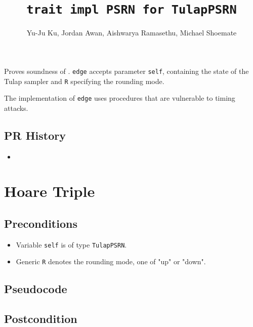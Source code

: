 \documentclass{article}
\title{\texttt{trait impl PSRN for TulapPSRN}}
\author{Yu-Ju Ku, Jordan Awan, Aishwarya Ramasethu, Michael Shoemate}
\begin{document}
\maketitle

\contrib

Proves soundness of .
\texttt{edge} accepts parameter \texttt{self}, containing the state of the Tulap sampler and \texttt{R} specifying the rounding mode.
\floatingPoint

\begin{tcolorbox}
    \begin{warning}
        The implementation of \texttt{edge} uses procedures that are vulnerable to timing attacks. 
    \end{warning}
\end{tcolorbox}

\subsection*{PR History}
\begin{itemize}
    \item {}
\end{itemize}

\section{Hoare Triple}

\subsection*{Preconditions}
\begin{itemize}
    \item Variable \texttt{self} is of type \texttt{TulapPSRN}.
    \item Generic \texttt{R} denotes the rounding mode, one of "up" or "down".
\end{itemize}

\subsection*{Pseudocode}



\subsection*{Postcondition}
\end{document}
